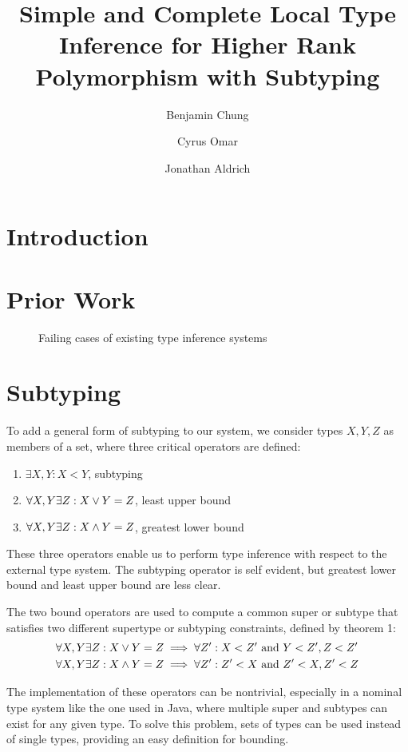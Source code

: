 \documentclass{llncs}
\title{Simple and Complete Local Type Inference for Higher Rank Polymorphism with Subtyping}
\author{Benjamin Chung\and Cyrus Omar \and Jonathan Aldrich}
\institute{\email{\{bwchung,comar,aldrich\}@cs.cmu.edu}\\Carnegie Mellon University}
\begin{document}
\maketitle
\begin{abstract}
\end{abstract}

\section{Introduction}


\section{Prior Work}


\begin{figure}

\caption{Failing cases of existing type inference systems}
\label{fig:cons}
\end{figure}

\section{Subtyping} To add a general form of subtyping to our system, we consider types $X,Y,Z$ as members of a set, where three critical operators are defined:
\begin{enumerate}
\item $\exists X, Y: X < Y$, subtyping
\item $\forall X,Y\exists Z: X \vee Y = Z$, least upper bound
\item $\forall X,Y\exists Z: X \wedge Y = Z$, greatest lower bound
\end{enumerate}

These three operators enable us to perform type inference with respect to the external type system. The subtyping operator is self evident, but greatest lower bound and least upper bound are less clear.

The two bound operators are used to compute a common super or subtype that satisfies two different supertype or subtyping constraints, defined by theorem 1:
\begin{align*}
\forall X,Y\exists Z: X\vee Y = Z &\implies \forall Z': X < Z' \text{ and } Y < Z', Z < Z'\\
\forall X,Y\exists Z: X\wedge Y = Z &\implies \forall Z': Z'<X \text{ and } Z'<X, Z' < Z\\
\end{align*}

The implementation of these operators can be nontrivial, especially in a nominal type system like the one used in Java, where multiple super and subtypes can exist for any given type. To solve this problem, sets of types can be used instead of single types, providing an easy definition for bounding.
\end{document}
